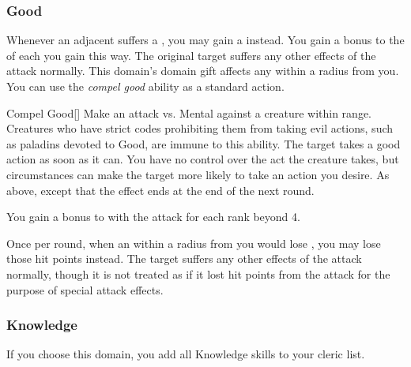         \subsubsection{Good}
             Whenever an adjacent  suffers a , you may gain a  instead.
            You gain a  bonus to the  of each  you gain this way.
            The original target suffers any other effects of the attack normally.
             This domain's domain gift affects any  within a \areamed radius  from you.
             You can use the \textit{compel good} ability as a standard action.
            \begin{freeability}{Compel Good}[]
                Make an attack vs. Mental against a creature within \rngmed range.
                Creatures who have strict codes prohibiting them from taking evil actions, such as paladins devoted to Good, are immune to this ability.
                \hit The target takes a good action as soon as it can.
                You have no control over the act the creature takes, but circumstances can make the target more likely to take an action you desire.
                \glance As above, except that the effect ends at the end of the next round.

                \rankline
                You gain a  bonus to  with the attack for each rank beyond 4.
            \end{freeability}
             Once per round, when an  within a \areamed radius  from you would lose , you may lose those hit points instead.
            The target suffers any other effects of the attack normally, though it is not treated as if it lost hit points from the attack for the purpose of special attack effects.

        \subsubsection{Knowledge}
            If you choose this domain, you add all Knowledge skills to your cleric  list.

